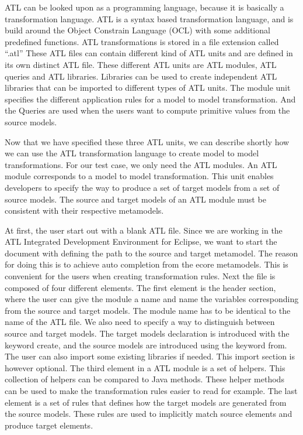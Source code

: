 \documentclass[pdftex,11pt,a4paper]{article}
\begin{document}
\noindent ATL can be looked upon as a programming language, because it is
basically a transformation language. ATL is a syntax based transformation
language, and is build around the Object Constrain Language (OCL) \cite{OCL}
with some additional predefined functions. ATL transformations is stored in a
file extension called ``.atl'' These ATL files can contain different kind of
ATL units and are defined in its own distinct ATL file. These different ATL
units are ATL modules, ATL queries and ATL libraries. Libraries can be used to
create independent ATL libraries that can be imported to different types of ATL
units. The module unit specifies the different application rules for a model to
model transformation. And the Queries are used when the users want to compute
primitive values from the source models.

Now that we have specified these three ATL units, we can describe shortly how
we can use the ATL transformation language to create model to model
transformations. For our test case, we only need the ATL modules. An ATL module
corresponds to a model to model transformation. This unit enables developers to
specify the way to produce a set of target models from a set of source models.
The source and target models of an ATL module must be consistent with their
respective metamodels. 

At first, the user start out with a blank ATL file. Since we are working in
the ATL Integrated Development Environment for Eclipse, we want to start the
document with defining the path to the source and target metamodel. The
reason for doing this is to achieve auto completion from the ecore metamodels.
This is convenient for the users when creating transformation rules. Next the
file is composed of four different elements. The first element is the header
section, where the user can give the module a name and name the variables
corresponding from the source and target models. The module name has to be
identical to the name of the ATL file. We also need to specify a way to
distinguish between source and target models. The target models declaration is
introduced with the keyword create, and the source models are introduced using
the keyword from. The user can also import some existing libraries if needed.
This import section is however optional. The third element in a ATL module is a
set of helpers. This collection of helpers can be compared to Java methods.
These helper methods can be used to make the transformation rules easier to read
for example. The last element is a set of rules that defines how the target
models are generated from the source models. These rules are used to implicitly
match source elements and produce target elements. 
\end{document}

